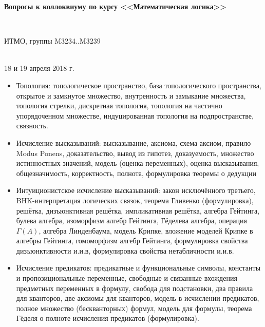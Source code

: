 \documentclass[11pt,a4paper,oneside]{article}
\begin{document}
\begin{center}
\begin{Large}{\bfseries Вопросы к коллоквиуму по курсу <<Математическая логика>>}\end{Large}\\
\vspace{1mm}
\begin{small} ИТМО, группы M3234..M3239\end{small}\\
\small 18 и 19 апреля 2018 г.
\end{center}

\begin{itemize}
\item Топология: топологическое пространство, база топологического пространства, 
открытое и замкнутое множество, внутренность и замыкание множества, топология стрелки,
дискретная топология, топология на частично упорядоченном множестве,
индуцированная топология на подпространстве, связность.
\item Исчисление высказываний: высказывание, аксиома,
схема аксиом, правило Modus Ponens, доказательство,
вывод из гипотез, доказуемость, 
множество истинностных значений, модель (оценка переменных), оценка высказывания, общезначимость, 
корректность, полнота, формулировка теоремы о дедукции
\item Интуиционистское исчисление высказываний: 
закон исключённого третьего, BHK-интерпретация логических связок, теорема Гливенко (формулировка),
решётка, дизъюнктивная решётка, импликативная решётка, 
алгебра Гейтинга, булева алгебра, изоморфизм алгебр Гейтинга,
Гёделева алгебра, операция $\Gamma(A)$, алгебра Линденбаума,
модель Крипке, вложение моделей Крипке в алгебры Гейтинга, гомоморфизм алгебр Гейтинга,
формулировка свойства дизъюнктивности и.и.в, формулировка свойства нетабличности и.и.в.
\item Исчисление предикатов:
предикатные и функциональные символы, константы и пропозициональные переменные,
свободные и связанные вхождения предметных переменных в формулу, 
свобода для подстановки, два правила для кванторов, две аксиомы для кванторов,
модель в исчислении предикатов, полное множество (бескванторных) формул, 
модель для формулы, теорема Гёделя о полноте исчисления предикатов (формулировка).
\end{itemize}
\end{document}
